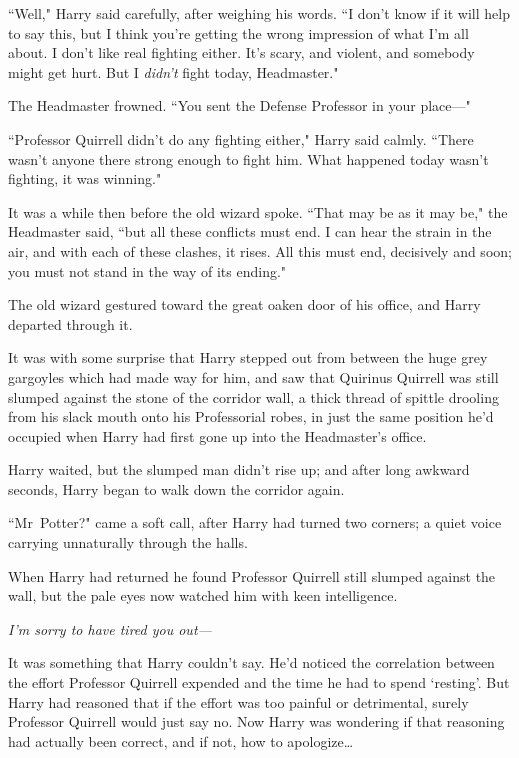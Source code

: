 ``Well," Harry said carefully, after weighing his words. ``I don't know if it will help to say this, but I think you're getting the wrong impression of what I'm all about. I don't like real fighting either. It's scary, and violent, and somebody might get hurt. But I \emph{didn't} fight today, Headmaster."

The Headmaster frowned. ``You sent the Defense Professor in your place—"

``Professor Quirrell didn't do any fighting either," Harry said calmly. ``There wasn't anyone there strong enough to fight him. What happened today wasn't fighting, it was winning."

It was a while then before the old wizard spoke. ``That may be as it may be," the Headmaster said, ``but all these conflicts must end. I can hear the strain in the air, and with each of these clashes, it rises. All this must end, decisively and soon; you must not stand in the way of its ending."

The old wizard gestured toward the great oaken door of his office, and Harry departed through it.

\later

It was with some surprise that Harry stepped out from between the huge grey gargoyles which had made way for him, and saw that Quirinus Quirrell was still slumped against the stone of the corridor wall, a thick thread of spittle drooling from his slack mouth onto his Professorial robes, in just the same position he'd occupied when Harry had first gone up into the Headmaster's office.

Harry waited, but the slumped man didn't rise up; and after long awkward seconds, Harry began to walk down the corridor again.

``Mr~Potter?" came a soft call, after Harry had turned two corners; a quiet voice carrying unnaturally through the halls.

When Harry had returned he found Professor Quirrell still slumped against the wall, but the pale eyes now watched him with keen intelligence.

\emph{I'm sorry to have tired you out—}

It was something that Harry couldn't say. He'd noticed the correlation between the effort Professor Quirrell expended and the time he had to spend `resting'. But Harry had reasoned that if the effort was too painful or detrimental, surely Professor Quirrell would just say no. Now Harry was wondering if that reasoning had actually been correct, and if not, how to apologize{\ldots}

